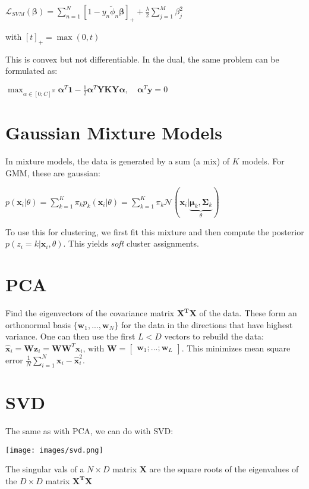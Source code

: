 \documentclass[10pt,a4paper,landscape]{article}
\renewcommand{\bf}[1]{\ensuremath{\mathbf{#1}}}
\newcommand{\balpha}{\boldsymbol\alpha}
\newcommand{\bbeta}{\boldsymbol\beta}
\begin{document}
\begin{multicols*}{4}
$\mathcal{L}_{SVM} (\bbeta)= \sum_{n=1}^N [1 - y_n \tilde\phi_n \bbeta]_{+} + \frac{\lambda}{2} \sum_{j=1}^M \beta_j^2$

with $[t]_{+} = \max(0, t)$

This is convex but not differentiable. In the dual, the same problem can be formulated as:

$\max_{\alpha \in [0; C]^N} \balpha^T \bf{1} - \frac{1}{2} \balpha^T \bf{Y K Y} \balpha , \quad \balpha^T \bf{y} = 0$

\section{Gaussian Mixture Models}
In mixture models, the data is generated by a sum (a mix) of $K$ models. For GMM, these are gaussian:

$p(\bf{x}_i | \theta) = \sum_{k=1}^K \pi_k p_k(\bf{x}_i | \theta) =  \sum_{k=1}^K \pi_k \mathcal{N}(\bf{x}_i | \underbrace{\bf{\mu}_k, \bf{\Sigma}_k}_{\theta})$

To use this for clustering, we first fit this mixture and then compute the posterior $p(z_i = k | \bf{x}_i, \theta)$. This yields \textit{soft} cluster assignments.

\section{PCA}
Find the eigenvectors of the covariance matrix $\bf{X^T X}$ of the data. These form an orthonormal basis $\{ \bf{w}_1, ..., \bf{w}_N\}$ for the data in the directions that have highest variance.
One can then use the first $L < D$ vectors to rebuild the data: $\bf{\hat{x}}_i = \bf{W} \bf{z}_i = \bf{W} \bf{W}^T \bf{x}_i$, with $\bf{W} = \begin{bmatrix} \bf{w}_1 ; ... ; \bf{w}_L \end{bmatrix}$.
This minimizes mean square error $\frac{1}{N} \sum_{i=1}^N \bf{x}_i - \bf{\hat{x}}_i^2$.

\section{SVD}
The same as with PCA, we can do with SVD:
\begin{colfig}
  \centering
  \texttt{[image: images/svd.png]}
\end{colfig}

The singular vals of a $N \times D$ matrix $\bf{X}$ are the square roots of the eigenvalues of the $D \times D$ matrix $\bf{X^T X}$

\end{multicols*}
\end{document}
